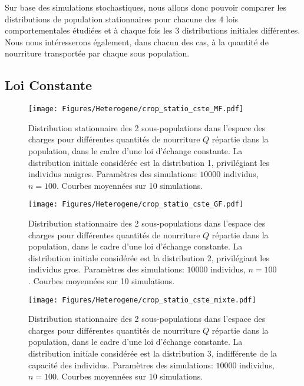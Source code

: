 Sur base des simulations stochastiques, nous allons donc pouvoir comparer les distributions de population stationnaires pour chacune des 4 lois comportementales étudiées et à chaque fois les 3 distributions initiales différentes. Nous nous intéresserons également, dans chacun des cas, à la quantité de nourriture transportée par chaque sous population.

\pagebreak
\subsection{Loi Constante}


\begin{figure}[h!]
\centering
\texttt{[image: Figures/Heterogene/crop\_statio\_cste\_MF.pdf]}
\caption{Distribution stationnaire des 2 sous-populations dans l'espace des charges pour différentes quantités de nourriture $Q$ répartie dans la population, dans le cadre d'une loi d'échange constante. La distribution initiale considérée est la distribution 1, privilégiant les individus maigres. Paramètres des simulations: $10000$ individus, $n=100$. Courbes moyennées sur 10 simulations.}
\label{statio_cste_MF}
\end{figure}

\begin{figure}[h!]
\centering
\texttt{[image: Figures/Heterogene/crop\_statio\_cste\_GF.pdf]}
\caption{Distribution stationnaire des 2 sous-populations dans l'espace des charges pour différentes quantités de nourriture $Q$ répartie dans la population, dans le cadre d'une loi d'échange constante. La distribution initiale considérée est la distribution 2, privilégiant les individus gros. Paramètres des simulations: $10000$ individus, $n=100$. Courbes moyennées sur 10 simulations.}
\label{statio_cste_GF}
\end{figure}

\begin{figure}[h!]
\centering
\texttt{[image: Figures/Heterogene/crop\_statio\_cste\_mixte.pdf]}
\caption{Distribution stationnaire des 2 sous-populations dans l'espace des charges pour différentes quantités de nourriture $Q$ répartie dans la population, dans le cadre d'une loi d'échange constante. La distribution initiale considérée est la distribution 3, indifférente de la capacité des individus. Paramètres des simulations: $10000$ individus, $n=100$. Courbes moyennées sur 10 simulations.}
\label{statio_cste_mixte}
\end{figure}


